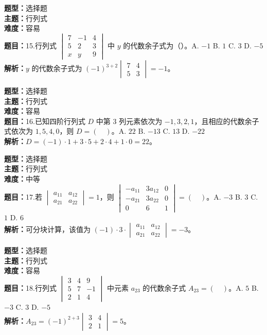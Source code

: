 \documentclass{ctexart}
\newenvironment{question}[5]{%
	\noindent\textbf{题型：}#1\\
	\textbf{主题：}#2\\
	\textbf{难度：}#3\\
	\textbf{题目：}#4\\
	\textbf{解析：}#5\\
	\vspace{1em}
}{}
\begin{document}
	\begin{question}
		{选择题}
		{行列式}
		{容易}
		{15.行列式 $\begin{vmatrix}7 & -1 & 4 \\ 5 & 2 & 3 \\ x & y & 9\end{vmatrix}$ 中 $y$ 的代数余子式为（\quad）。A. $-1$ \quad B. $1$ \quad C. $3$ \quad D. $-5$}
		{$y$ 的代数余子式为 $(-1)^{3+2} \begin{vmatrix}7 & 4 \\ 5 & 3\end{vmatrix} = -1$。}
	\end{question}
	
	\begin{question}
		{选择题}
		{行列式}
		{容易}
		{16.已知四阶行列式 $D$ 中第 3 列元素依次为 $-1,3,2,1$，且相应的代数余子式依次为 $1,5,4,0$，则 $D=(\quad)$。A. $22$ \quad B. $-13$ \quad C. $13$ \quad D. $-22$}
		{$D = (-1)\cdot 1 + 3\cdot 5 + 2\cdot 4 + 1\cdot 0 = 22$。}
	\end{question}
	
	\begin{question}
		{选择题}
		{行列式}
		{中等}
		{17.若 $\begin{vmatrix}a_{11} & a_{12} \\ a_{21} & a_{22}\end{vmatrix} = 1$，则 $\begin{vmatrix}-a_{11} & 3a_{12} & 0 \\ -a_{21} & 3a_{22} & 0 \\ 0 & 6 & 1\end{vmatrix}=(\quad)$。A. $-3$ \quad B. $3$ \quad C. $1$ \quad D. $6$}
		{可分块计算，该值为 $(-1) \cdot 3 \cdot \begin{vmatrix}a_{11} & a_{12} \\ a_{21} & a_{22}\end{vmatrix} = -3$。}
	\end{question}
	
	\begin{question}
		{选择题}
		{行列式}
		{容易}
		{18.行列式 $\begin{vmatrix}3 & 4 & 9 \\ 5 & 7 & -1 \\ 2 & 1 & 4\end{vmatrix}$ 中元素 $a_{23}$ 的代数余子式 $A_{23}=(\quad)$。A. $5$ \quad B. $-3$ \quad C. $3$ \quad D. $-5$}
		{$A_{23} = (-1)^{2+3} \begin{vmatrix}3 & 4 \\ 2 & 1\end{vmatrix} = 5$。}
	\end{question}
	
\end{document}
